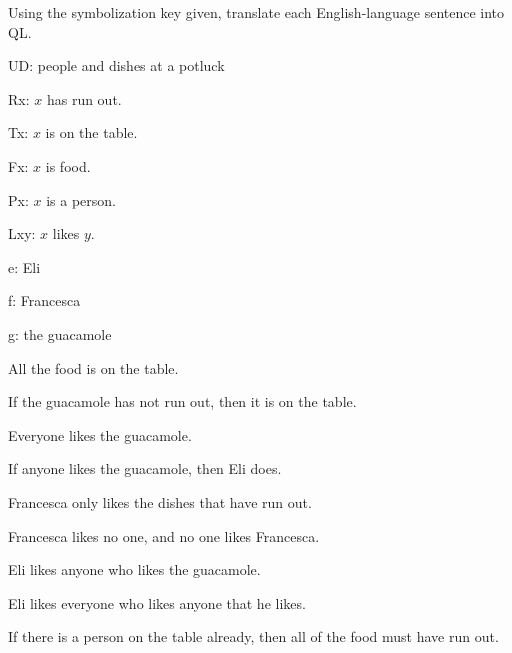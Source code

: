 \solutions
\problempart
\label{pr.QLpotluck}
Using the symbolization key given, translate each English-language sentence into QL.
\begin{ekey}
\item[UD:] people and dishes at a potluck
\item[Rx:] $x$ has run out.
\item[Tx:] $x$ is on the table.
\item[Fx:] $x$ is food.
\item[Px:] $x$ is a person.
\item[Lxy:] $x$ likes $y$.
\item[e:] Eli
\item[f:] Francesca
\item[g:] the guacamole
\end{ekey}
\begin{earg}
\item All the food is on the table.
\item If the guacamole has not run out, then it is on the table.
\item Everyone likes the guacamole.
\item If anyone likes the guacamole, then Eli does.
\item Francesca only likes the dishes that have run out.
\item Francesca likes no one, and no one likes Francesca.
\item Eli likes anyone who likes the guacamole.
\item Eli likes everyone who likes anyone that he likes.
\item If there is a person on the table already, then all of the food must have run out.
\end{earg}


